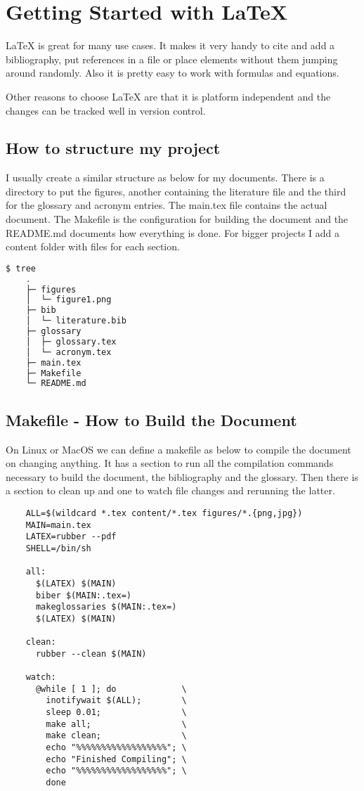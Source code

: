 \documentclass{article}
\begin{document}
  \section{Getting Started with LaTeX}

  LaTeX is great for many use cases. It makes it very handy to cite and add a
  bibliography, put references in a file or place elements without them jumping
  around randomly. Also it is pretty easy to work with formulas and equations.

  Other reasons to choose LaTeX are that it is platform independent and the
  changes can be tracked well in version control.

  \subsection{How to structure my project}

  I usually create a similar structure as below for my documents. There is a
  directory to put the figures, another containing the literature file and the
  third for the glossary and acronym entries.
  The main.tex file contains the actual document. The Makefile is the
  configuration for building the document and the README.md documents how
  everything is done. For bigger projects I add a content folder with files for
  each section.

  \begin{lstlisting}[language=Bash]
  $ tree
    .
    ├─ figures
    │  └─ figure1.png
    ├─ bib
    │  └─ literature.bib
    ├─ glossary
    │  ├─ glossary.tex
    │  └─ acronym.tex
    ├─ main.tex
    ├─ Makefile
    └─ README.md
  \end{lstlisting}

  \subsection{Makefile - How to Build the Document}

  On Linux or MacOS we can define a makefile as below to compile the document
  on changing anything. It has a section to run all the compilation commands
  necessary to build the document, the bibliography and the glossary. Then
  there is a section to clean up and one to watch file changes and rerunning
  the latter.

  \begin{lstlisting}
    ALL=$(wildcard *.tex content/*.tex figures/*.{png,jpg})
    MAIN=main.tex
    LATEX=rubber --pdf
    SHELL=/bin/sh

    all:
      $(LATEX) $(MAIN)
      biber $(MAIN:.tex=)
      makeglossaries $(MAIN:.tex=)
      $(LATEX) $(MAIN)

    clean:
      rubber --clean $(MAIN)

    watch:
      @while [ 1 ]; do             \
        inotifywait $(ALL);        \
        sleep 0.01;                \
        make all;                  \
        make clean;                \
        echo "%%%%%%%%%%%%%%%%%%"; \
        echo "Finished Compiling"; \
        echo "%%%%%%%%%%%%%%%%%%"; \
        done
  \end{lstlisting}
\end{document}
